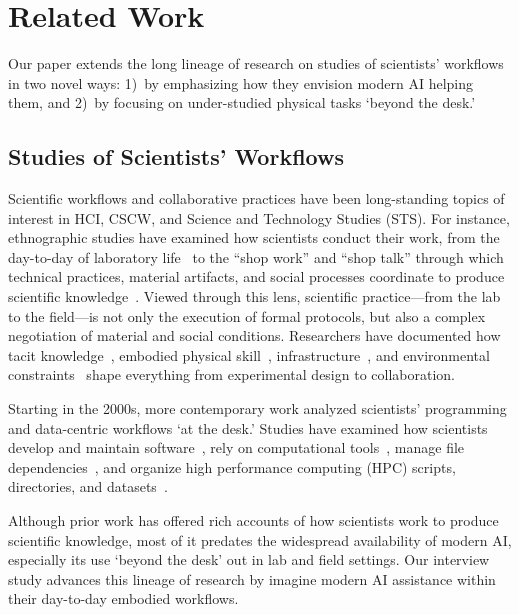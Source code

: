 \section{Related Work}

Our paper extends the long lineage of research on studies of scientists' workflows in two novel ways: 1)~by emphasizing how they envision modern AI helping them, and 2)~by focusing on under-studied physical tasks `beyond the desk.'


\subsection{Studies of Scientists' Workflows}

Scientific workflows and collaborative practices have been long-standing topics of interest in HCI, CSCW, and Science and Technology Studies (STS). For instance, ethnographic studies have examined how scientists conduct their work, from the day-to-day of laboratory life~\cite{latour2013laboratory} to the ``shop work'' and ``shop talk'' through which technical practices, material artifacts, and social processes coordinate to produce scientific knowledge~\cite{lynch1979art}. Viewed through this lens, scientific practice---from the lab to the field---is not only the execution of formal protocols, but also a complex negotiation of material and social conditions. Researchers have documented how tacit knowledge~\cite{collins1974tea}, embodied physical skill~\cite{cetina1999epistemic}, infrastructure~\cite{vertesi2014seamful}, and environmental constraints~\cite{yeh2006butterflynet} shape everything from experimental design to collaboration.

Starting in the 2000s, more contemporary work analyzed scientists' programming and data-centric workflows `at the desk.' Studies have examined how scientists develop and maintain software~\cite{hannah2009how, carver2007software}, rely on computational tools~\cite{huang2025scientists}, manage file dependencies~\cite{gori2020fileweaver}, and organize high performance computing (HPC) scripts, directories, and datasets~\cite{strong2011alamos}.

Although prior work has offered rich accounts of how scientists work to produce scientific knowledge, most of it predates the widespread availability of modern AI, especially its use `beyond the desk' out in lab and field settings. Our interview study advances this lineage of research by  imagine modern AI assistance within their day-to-day embodied workflows.

